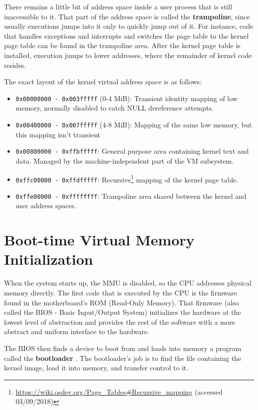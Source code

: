\documentclass[shortabstract, english]{iithesis}
\begin{document}
There remains a little bit of address space inside a user process that is still
inaccessible to it. That part of the address space is called the
\textbf{trampoline}, since usually executions jumps into it only to quickly jump
out of it. For instance, code that handles exceptions and interrupts and
switches the page table to the kernel page table can be found in the trampoline
area. After the kernel page table is installed, execution jumps to lower
addresses, where the remainder of kernel code resides.

The exact layout of the kernel virtual address space is as follows:
\begin{itemize}
\item \texttt{0x00000000 - 0x003fffff} (0-4 MiB): Transient identity mapping of
  low memory, normally disabled to catch NULL dereference attempts.
\item \texttt{0x00400000 - 0x007fffff} (4-8 MiB): Mapping of the same low
  memory, but this mapping isn't transient
\item \texttt{0x00800000 - 0xffbfffff}: General purpose area containing kernel
  text and data. Managed by the machine-independent part of the VM subsystem.
\item \texttt{0xffc00000 - 0xffdfffff}:
  Recursive\footnote{ \url{https://wiki.osdev.org/Page_Tables#Recursive_mapping}
    (accessed 03/09/2018)} mapping of the kernel page table.
\item \texttt{0xffe00000 - 0xffffffff}: Trampoline area shared between the
  kernel and user address spaces.
\end{itemize}

\section{Boot-time Virtual Memory Initialization}

When the system starts up, the MMU is disabled, so the CPU addresses physical
memory directly. The first code that is executed by the CPU is the firmware
found in the motherboard's ROM (Read-Only Memory). That firmware (also called
the BIOS - Basic Input/Output System) \cite[Section~15.1]{bib:mckusick14}
initializes the hardware at the lowest level of abstraction and provides the
rest of the software with a more abstract and uniform interface to the hardware.

The BIOS then finds a device to boot from and loads into memory a program called
the \textbf{bootloader} \cite[Section~15.2]{bib:mckusick14}. The bootloader's
job is to find the file containing the kernel image, load it into memory, and
transfer control to it.
\end{document}
